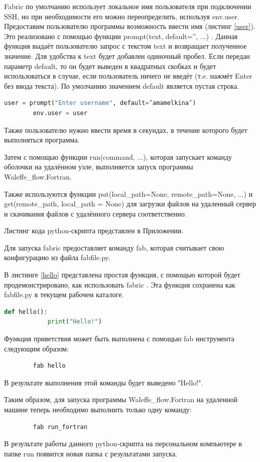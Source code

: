 Fabric по умолчанию использует локальное имя пользователя при подключении SSH, но при необходимости его можно переопределить, используя env.user. Предоставим пользователю программы возможность ввести имя (листинг \ref{user}). Это реализовано с помощью функции prompt(text, default='', ...) \cite{fabric-func}.
Данная функция выдаёт пользователю запрос с текстом text и возвращает полученное значение. Для удобства к text будет добавлен одиночный пробел.
Если передан параметр default, то он будет выведен в квадратных скобках и будет использоваться в случае, если пользователь ничего не введёт (т.e. нажмёт Enter без ввода текста). По умолчанию значением default является пустая строка.
\begin{lstlisting}[label=user, language=Python, caption=Добавление имени пользователя в переменную окружения env] 
        user = prompt("Enter username", default=’amamelkina’)
        env.user = user
\end{lstlisting}

Также пользователю нужно ввести время в секундах, в течение которого будет выполняться программа.

Затем с помощью функции run(command, ...), которая запускает команду оболочки на удалённом узле, выполняется запуск программы Waleffe\_flow.Fortran.

Также используются функции put(local\_path=None, remote\_path=None, ...) и get(remote\_path, local\_path = None) для загрузки файлов на удаленный сервер и скачивания файлов с удалённого сервера соответственно.

Листинг кода python-скрипта представлен в Приложении.

Для запуска fabric предоставляет команду fab, которая считывает свою конфигурацию из файла fabfile.py.

В листинге \ref{hello} представлена простая функция, с помощью которой будет продемонстрировано, как использовать fabric \cite{fabric-hello}. Эта функция сохранена как fabfile.py в текущем рабочем каталоге.
\begin{lstlisting}[label=hello, language=Python, caption=Пример функции]
        def hello():
            print("Hello!")
\end{lstlisting}

 Функция приветствия может быть выполнена с помощью fab инструмента следующим образом:
\begin{verbatim}
        fab hello
\end{verbatim}

В результате выполнения этой команды будет выведено "Hello!".

Таким образом, для запуска программы Waleffe\_flow.Fortran на удаленной машине теперь необходимо выполнить только одну команду:
\begin{verbatim}
        fab run_fortran
\end{verbatim}

В результате работы данного python-скрипта на персональном компьютере в папке run появится новая папка с результатами запуска.

\noteattributes{}
